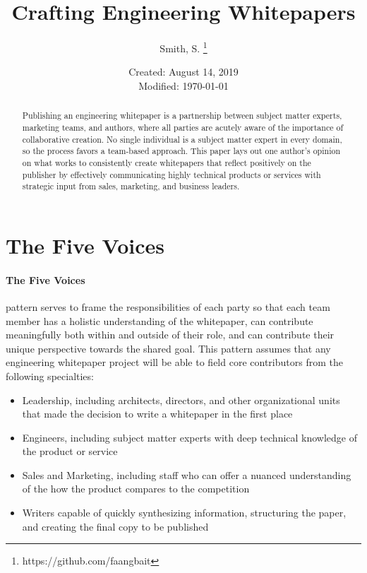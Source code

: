 \documentclass[letterpaper]{article}
\begin{document}
\title{Crafting Engineering Whitepapers}
\author{Smith, S. \thanks{https://github.com/faangbait}}
\date{Created: August 14, 2019 \\ Modified: \today}

\begin{titlepage}
    \maketitle
    \thispagestyle{empty}
    \begin{abstract}
        Publishing an engineering whitepaper is a partnership between subject matter experts, marketing teams, and authors, where all parties are acutely aware of the importance of collaborative creation. No single individual is a subject matter expert in every domain, so the process favors a team-based approach. This paper lays out one author's opinion on what works to consistently create whitepapers that reflect positively on the publisher by effectively communicating highly technical products or services with strategic input from sales, marketing, and business leaders.
    \end{abstract}
\end{titlepage}
\cleardoublepage

\tableofcontents
\thispagestyle{empty}
\cleardoublepage

\section{The Five Voices}\label{topic:voices}
\paragraph{The Five Voices} pattern serves to frame the responsibilities of each party so that each team member has a holistic understanding of the whitepaper, can contribute meaningfully both within and outside of their role, and can contribute their unique perspective towards the shared goal. This pattern assumes that any engineering whitepaper project will be able to field core contributors from the following specialties:

\begin{itemize}
    \item Leadership, including architects, directors, and other organizational units that made the decision to write a whitepaper in the first place
    \item Engineers, including subject matter experts with deep technical knowledge of the product or service
    \item Sales and Marketing, including staff who can offer a nuanced understanding of the how the product compares to the competition
    \item Writers capable of quickly synthesizing information, structuring the paper, and creating the final copy to be published
\end{itemize}
\end{document}
